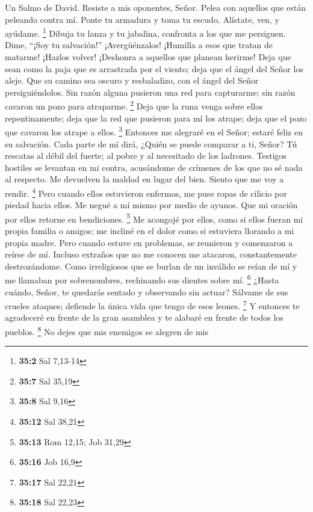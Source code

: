 Un Salmo de David.  Resiste a mis oponentes, Señor. Pelea
con aquellos que están peleando contra mí.  Ponte tu
armadura y toma tu escudo. Alístate, ven, y ayúdame. \footnote{\textbf{35:2}
  Sal 7,13-14}  Dibuja tu lanza y tu jabalina, confronta a
los que me persiguen. Dime, ``¡Soy tu salvación!'' 
¡Avergüénzalos! ¡Humilla a esos que tratan de matarme! ¡Hazlos volver!
¡Deshonra a aquellos que planean herirme!  Deja que sean
como la paja que es arrastrada por el viento; deja que el ángel del
Señor los aleje.  Que su camino sea oscuro y resbaladizo,
con el ángel del Señor persiguiéndolos.  Sin razón alguna
pusieron una red para capturarme; sin razón cavaron un pozo para
atraparme. \footnote{\textbf{35:7} Sal 35,19}  Deja que la
runa venga sobre ellos repentinamente; deja que la red que pusieron para
mí los atrape; deja que el pozo que cavaron los atrape a ellos.
\footnote{\textbf{35:8} Sal 9,16}  Entonces me alegraré en
el Señor; estaré feliz en su salvación.  Cada parte de mí
dirá, ¿Quién se puede comparar a ti, Señor? Tú rescatas al débil del
fuerte; al pobre y al necesitado de los ladrones.  Testigos
hostiles se levantan en mi contra, acusándome de crímenes de los que no
sé nada al respecto.  Me devuelven la maldad en lugar del
bien. Siento que me voy a rendir. \footnote{\textbf{35:12} Sal 38,21}
 Pero cuando ellos estuvieron enfermos, me puse ropas de
cilicio por piedad hacia ellos. Me negué a mí mismo por medio de ayunos.
Que mi oración por ellos retorne en bendiciones. \footnote{\textbf{35:13}
  Rom 12,15; Job 31,29}  Me acongojé por ellos, como si
ellos fueran mi propia familia o amigos; me incliné en el dolor como si
estuviera llorando a mi propia madre.  Pero cuando estuve
en problemas, se reunieron y comenzaron a reírse de mí. Incluso extraños
que no me conocen me atacaron, constantemente destrozándome.
 Como irreligiosos que se burlan de un inválido se reían de
mí y me llamaban por sobrenombres, rechinando sus dientes sobre mí.
\footnote{\textbf{35:16} Job 16,9}  ¿Hasta cuándo, Señor,
te quedarás sentado y observando sin actuar? Sálvame de sus crueles
ataques; defiende la única vida que tengo de esos leones. \footnote{\textbf{35:17}
  Sal 22,21}  Y entonces te agradeceré en frente de la gran
asamblea y te alabaré en frente de todos los pueblos. \footnote{\textbf{35:18}
  Sal 22,23}  No dejes que mis enemigos se alegren de mis
